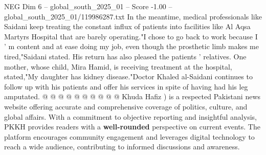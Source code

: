 \begin{textsample}{NEG Dim 6 – global\_south\_2025\_01 – Score -1.00 – global\_south\_2025\_01/119986287.txt}
In the meantime, medical professionals like Saidani keep treating the constant influx of patients into facilities like Al Aqsa Martyrs Hospital that are barely operating."I chose to go back to work because I ' m content and at ease doing my job, even though the prosthetic limb makes me tired,"Saidani stated.
His return has also pleased the patients ' relatives.
One mother, whose child, Mira Hamid, is receiving treatment at the hospital, stated,"My daughter has kidney disease."Doctor Khaled al-Saidani continues to follow up with his patients and offer his services in spite of having had his leg amputated. @ @ @ @ @ @ @ @ @ @ Khuda Hafiz ) is a respected Pakistani news website offering accurate and comprehensive coverage of politics, culture, and global affairs.
With a commitment to objective reporting and insightful analysis, PKKH provides readers with a \textbf{well-rounded} perspective on current events.
The platform encourages community engagement and leverages digital technology to reach a wide audience, contributing to informed discussions and awareness.

\end{textsample}
